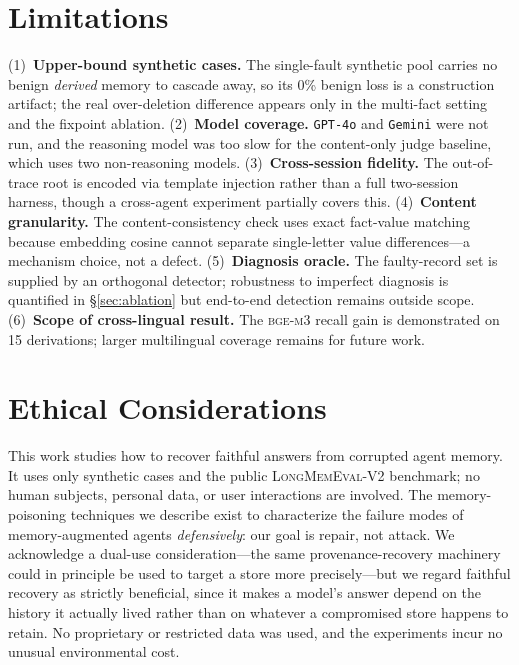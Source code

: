 \documentclass[11pt]{article}
\theoremstyle{remark}
\begin{document}
\section{Limitations}
\label{sec:limitations}

(1)~\textbf{Upper-bound synthetic cases.} The single-fault synthetic pool carries no
benign \emph{derived} memory to cascade away, so its 0\% benign loss is a construction
artifact; the real over-deletion difference appears only in the multi-fact setting and
the fixpoint ablation. (2)~\textbf{Model coverage.} \texttt{GPT-4o} and \texttt{Gemini}
were not run, and the reasoning model was too slow for the content-only judge baseline,
which uses two non-reasoning models. (3)~\textbf{Cross-session fidelity.} The
out-of-trace root is encoded via template injection rather than a full two-session
harness, though a cross-agent experiment partially covers this. (4)~\textbf{Content
granularity.} The content-consistency check uses exact fact-value matching because
embedding cosine cannot separate single-letter value differences---a mechanism choice,
not a defect. (5)~\textbf{Diagnosis oracle.} The faulty-record set is supplied by an
orthogonal detector; robustness to imperfect diagnosis is quantified in
\S\ref{sec:ablation} but end-to-end detection remains outside scope. (6)~\textbf{Scope
of cross-lingual result.} The \textsc{bge-m3} recall gain is demonstrated on 15
derivations; larger multilingual coverage remains for future work.

\section{Ethical Considerations}
\label{sec:ethics}

This work studies how to recover faithful answers from corrupted agent memory. It uses
only synthetic cases and the public \textsc{LongMemEval-V2} benchmark; no human subjects,
personal data, or user interactions are involved. The memory-poisoning techniques we
describe exist to characterize the failure modes of memory-augmented agents
\emph{defensively}: our goal is repair, not attack. We acknowledge a dual-use
consideration---the same provenance-recovery machinery could in principle be used to
target a store more precisely---but we regard faithful recovery as strictly beneficial,
since it makes a model's answer depend on the history it actually lived rather than on
whatever a compromised store happens to retain. No proprietary or restricted data was
used, and the experiments incur no unusual environmental cost.
\end{document}
